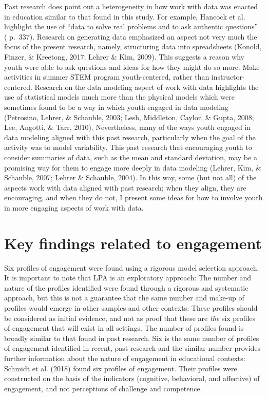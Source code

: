 \documentclass[]{book}
\theoremstyle{definition}
\theoremstyle{definition}
\theoremstyle{definition}
\theoremstyle{remark}
\begin{document}
Past research does point out a heterogeneity in how work with data was
enacted in education similar to that found in this study. For example,
Hancock et al. highlight the use of ``data to solve real problems and to
ask authentic questions'' ( p.~337). Research on generating data
emphasized an aspect not very much the focus of the present research,
namely, structuring data into spreadsheets (Konold, Finzer, \& Kreetong,
2017; Lehrer \& Kim, 2009). This suggests a reason why youth were able
to ask questions and ideas for how they might do so more: Make
activities in summer STEM program youth-centered, rather than
instructor-centered. Research on the data modeling aspect of work with
data highlights the use of statistical models much more than the
physical models which were sometimes found to be a way in which youth
engaged in data modeling (Petrosino, Lehrer, \& Schauble, 2003; Lesh,
Middleton, Caylor, \& Gupta, 2008; Lee, Angotti, \& Tarr, 2010).
Nevertheless, many of the ways youth engaged in data modeling aligned
with this past research, particularly when the goal of the activity was
to model variability. This past research that encouraging youth to
consider summaries of data, such as the mean and standard deviation, may
be a promising way for them to engage more deeply in data modeling
(Lehrer, Kim, \& Schauble, 2007; Lehrer \& Schauble, 2004). In this way,
some (but not all) of the aspects work with data aligned with past
research; when they align, they are encouraging, and when they do not, I
present some ideas for how to involve youth in more engaging aspects of
work with data.

\section{Key findings related to
engagement}\label{key-findings-related-to-engagement}

Six profiles of engagement were found using a rigorous model selection
approach. It is important to note that LPA is an exploratory approach:
The number and nature of the profiles identified were found through a
rigorous and systematic approach, but this is not a guarantee that the
same number and make-up of profiles would emerge in other samples and
other contexts: These profiles should be considered as initial evidence,
and not as proof that these are \emph{the} six profiles of engagement
that will exist in all settings. The number of profiles found is broadly
similar to that found in past research. Six is the same number of
profiles of engagement identified in recent, past research and the
similar number provides further information about the nature of
engagement in educational contexts: Schmidt et al. (2018) found six
profiles of engagement. Their profiles were constructed on the basis of
the indicators (cognitive, behavioral, and affective) of engagement, and
not perceptions of challenge and competence.
\end{document}
